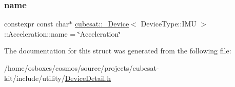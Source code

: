 \subsubsection{\texorpdfstring{name}{name}}
{\footnotesize\ttfamily constexpr const char$\ast$ \hyperlink{structcubesat_1_1__Device}{cubesat\+::\+\_\+\+Device}$<$ Device\+Type\+::\+I\+MU $>$\+::Acceleration\+::name = \char`\"{}Acceleration\char`\"{}\hspace{0.3cm}{\ttfamily [static]}}



The documentation for this struct was generated from the following file\+:\begin{DoxyCompactItemize}
\item 
/home/osboxes/cosmos/source/projects/cubesat-\/kit/include/utility/\hyperlink{DeviceDetail_8h}{Device\+Detail.\+h}\end{DoxyCompactItemize}
